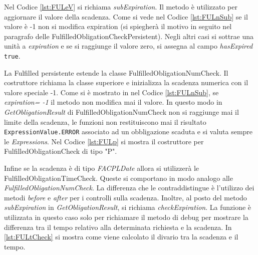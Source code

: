 Nel Codice \ref{lst:FULeV} si richiama \emph{subExpiration}. Il metodo è utilizzato per aggiornare il
valore della scadenza. Come si vede nel Codice \ref{lst:FULnSub} se il valore è -1 non si modifica expiration
(si spiegherà il motivo in seguito nel paragrafo delle FulfilledObligationCheckPersistent).
Negli altri casi si sottrae una unità a \emph{expiration} e
se si raggiunge il valore zero, si assegna al campo \emph{hasExpired} \texttt{true}.

La Fulfilled persistente estende la classe FulfilledObligationNumCheck.
Il costruttore richiama la classe superiore e inizializza la scadenza numerica con
il valore speciale -1. Come si è mostrato in nel Codice \ref{lst:FULnSub}, se \emph{expiration= -1}
il metodo non modifica mai il valore. In questo modo in \emph{GetObligationResult} di
FulfilledObligationNumCheck non si raggiunge mai
il limite della scadenza, le funzioni non restituiscono mai il risultato \texttt{ExpressionValue.ERROR} associato
ad un obbligazione scaduta e si valuta sempre le \emph{Expressions}.
Nel Codice \ref{lst:FULp} si mostra il costruttore per FulfilledObligationCheck di tipo "P".

Infine se la scadenza è di tipo \emph{FACPLDate} allora si utilizzerà le FulfilledObligationTimeCheck.
Queste si comportano in modo analogo alle \emph{FulfilledObligationNumCheck}. La differenza che le contraddistingue è
l'utilizzo dei metodi \emph{before} e \emph{after} per i controlli sulla scadenza.
Inoltre, al posto del metodo \emph{subExpiration} in \emph{GetObligationResult}, si richiama \emph{checkExpiration}.
La funzione è utilizzata in questo caso solo per richiamare il metodo di debug per mostrare
la differenza tra il tempo relativo alla determinata richiesta e la scadenza. In \ref{lst:FULtCheck} si
mostra come viene calcolato il divario tra la scadenza e il tempo.
